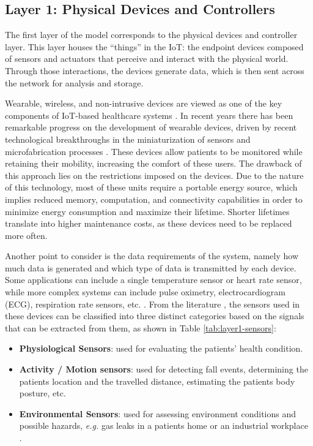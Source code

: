 \subsection{Layer 1: Physical Devices and Controllers}
\label{sec:iot-model-layer1}

The first layer of the model \cite{Cisco2014} corresponds to the physical devices and controller layer. This layer houses the ``things'' in the \acl{IoT}: the endpoint devices composed of sensors and actuators that perceive and interact with the physical world. Through those interactions, the devices generate data, which is then sent across the network for analysis and storage. \bigskip

Wearable, wireless, and non-intrusive devices are viewed as one of the key components of \acs{IoT}-based healthcare systems \cite{Baker2017}. In recent years there has been remarkable progress on the development of wearable devices, driven by recent technological breakthroughs in the miniaturization of sensors and microfabrication processes \cite{Adame2018, Catarinucci2015}. These devices allow patients to be monitored while retaining their mobility, increasing the comfort of these users. The drawback of this approach lies on the restrictions imposed on the devices. Due to the nature of this technology, most of these units require a portable energy source, which implies reduced memory, computation, and connectivity capabilities in order to minimize energy consumption and maximize their lifetime. Shorter lifetimes translate into higher maintenance costs, as these devices need to be replaced more often. \bigskip

Another point to consider is the data requirements of the system, namely how much data is generated and which type of data is transmitted by each device. Some applications can include a single temperature sensor or heart rate sensor, while more complex systems can include pulse oximetry, electrocardiogram (\acs{ECG}), respiration rate sensors, etc. \cite{Wu2020}. From the literature \cite{Wu2020, Wu2019, Adame2018, MinhDang2019}, the sensors used in these devices can be classified into three distinct categories based on the signals that can be extracted from them, as shown in Table \ref{tab:layer1-sensors}:

\begin{itemize}
    \item \textbf{Physiological Sensors}: used for evaluating the patients' health condition.
    \item \textbf{Activity / Motion sensors}: used for detecting fall events, determining the patients location and the travelled distance, estimating the patients body posture, etc.
    \item \textbf{Environmental Sensors}: used for assessing environment conditions and possible hazards, \textit{e.g.} gas leaks in a patients home or an industrial workplace \cite{Wu2019}.
\end{itemize}

